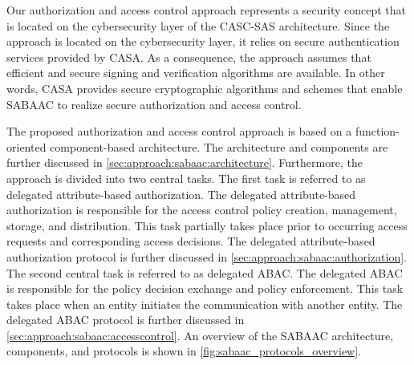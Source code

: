 Our authorization and access control approach represents a security concept that is located on the cybersecurity layer of the CASC-SAS architecture.
Since the approach is located on the cybersecurity layer, it relies on secure authentication services provided by CASA.
As a consequence, the approach assumes that efficient and secure signing and verification algorithms are available.
In other words, CASA provides secure cryptographic algorithms and schemes that enable SABAAC to realize secure authorization and access control.

The proposed authorization and access control approach is based on a function-oriented component-based architecture.
The architecture and components are further discussed in \autoref{sec:approach:sabaac:architecture}.
Furthermore, the approach is divided into two central tasks.
The first task is referred to as delegated attribute-based authorization.
The delegated attribute-based authorization is responsible for the access control policy creation, management, storage, and distribution.
This task partially takes place prior to occurring access requests and corresponding access decisions.
The delegated attribute-based authorization protocol is further discussed in \autoref{sec:approach:sabaac:authorization}.
The second central task is referred to as delegated ABAC.
The delegated ABAC is responsible for the policy decision exchange and policy enforcement.
This task takes place when an entity initiates the communication with another entity.
The delegated ABAC protocol is further discussed in \autoref{sec:approach:sabaac:accesscontrol}.
An overview of the SABAAC architecture, components, and protocols is shown in \autoref{fig:sabaac_protocols_overview}.
